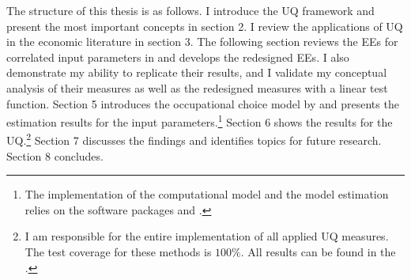\noindent
The structure of this thesis is as follows. I introduce the UQ framework and present the most important concepts in section 2. I review the applications of UQ in the economic literature in section 3. The following section reviews the EEs for correlated input parameters in \cite{ge2017extending} and develops the redesigned EEs. I also demonstrate my ability to replicate their results, and I validate my conceptual analysis of their measures as well as the redesigned measures with a linear test function. Section 5 introduces the occupational choice model by \cite{Keane.1994} and presents the estimation results for the input parameters.\footnote{The implementation of the computational model and the model estimation relies on the software packages  and .} Section 6 shows the results for the UQ.\footnote{I am responsible for the entire implementation of all applied UQ measures. The test coverage for these methods is $100\%$. All results can be found in the .} Section 7 discusses the findings and identifies topics for future research. Section 8 concludes.





